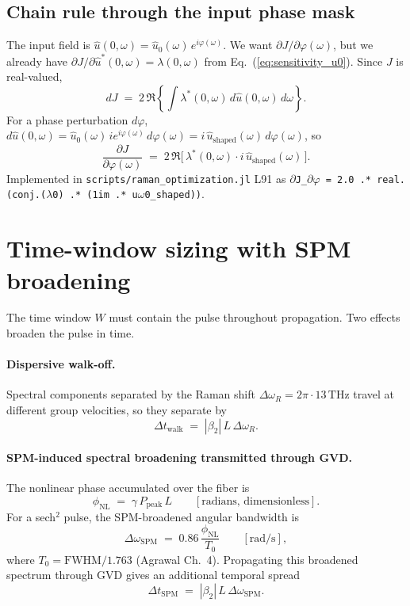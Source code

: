 \documentclass[11pt]{article}
\providecommand{\pdv}[2]{\frac{\partial #1}{\partial #2}}
\newcommand{\uhat}{\hat{u}}
\begin{document}
\subsection{Chain rule through the input phase mask}

The input field is $\uhat(0,\omega) = \uhat_0(\omega)\,e^{i\varphi(\omega)}$.
We want $\partial J / \partial \varphi(\omega)$, but we already have
$\partial J / \partial \uhat^*(0,\omega) = \lambda(0,\omega)$ from
Eq.~(\ref{eq:sensitivity_u0}). Since $J$ is real-valued,
\[
  dJ \;=\; 2\,\Re\!\left\{\int \lambda^*(0,\omega)\,d\uhat(0,\omega)\,d\omega\right\}.
\]
For a phase perturbation $d\varphi$,
$d\uhat(0,\omega) = \uhat_0(\omega)\,i e^{i\varphi(\omega)}\,d\varphi(\omega)
= i\,\uhat_\text{shaped}(\omega)\,d\varphi(\omega)$, so
\begin{equation}
  \pdv{J}{\varphi(\omega)}
  \;=\; 2\,\Re\!\bigl[\,\lambda^*(0,\omega)\cdot i\,\uhat_\text{shaped}(\omega)\,\bigr].
  \label{eq:phase_gradient}
\end{equation}
Implemented in \texttt{scripts/raman\_optimization.jl} L91 as
\texttt{$\partial$J\_$\partial\varphi$ = 2.0 .* real.(conj.($\lambda$0) .* (1im .* u$\omega$0\_shaped))}.

\section{Time-window sizing with SPM broadening}

The time window $W$ must contain the pulse throughout propagation. Two effects
broaden the pulse in time.

\paragraph{Dispersive walk-off.} Spectral components separated by the Raman
shift $\Delta\omega_R = 2\pi \cdot 13\,\mathrm{THz}$ travel at different group
velocities, so they separate by
\begin{equation}
  \Delta t_\text{walk} \;=\; |\beta_2|\,L\,\Delta\omega_R.
  \label{eq:walkoff}
\end{equation}

\paragraph{SPM-induced spectral broadening transmitted through GVD.} The
nonlinear phase accumulated over the fiber is
\begin{equation}
  \phi_\text{NL} \;=\; \gamma\,P_\text{peak}\,L \qquad [\text{radians, dimensionless}].
  \label{eq:phi_NL}
\end{equation}
For a sech$^2$ pulse, the SPM-broadened angular bandwidth is
\begin{equation}
  \Delta\omega_\text{SPM} \;=\; 0.86\,\frac{\phi_\text{NL}}{T_0}
  \qquad [\text{rad/s}],
  \label{eq:domega_spm}
\end{equation}
where $T_0 = \text{FWHM}/1.763$ (Agrawal Ch.~4). Propagating this broadened
spectrum through GVD gives an additional temporal spread
\begin{equation}
  \Delta t_\text{SPM} \;=\; |\beta_2|\,L\,\Delta\omega_\text{SPM}.
  \label{eq:dt_spm}
\end{equation}
\end{document}
